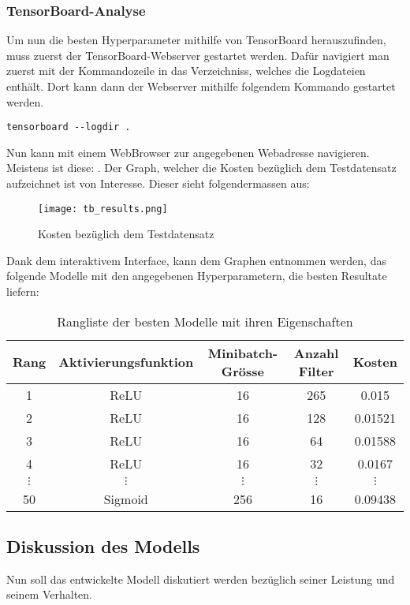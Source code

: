 \subsubsection{TensorBoard-Analyse}
Um nun die besten Hyperparameter mithilfe von TensorBoard herauszufinden, muss
zuerst der TensorBoard-Webserver gestartet werden. Dafür navigiert man zuerst
mit der Kommandozeile in das Verzeichniss, welches die Logdateien enthält.
Dort kann dann der Webserver mithilfe folgendem Kommando gestartet werden.
\begin{verbatim}
tensorboard --logdir .
\end{verbatim}
Nun kann mit einem WebBrowser zur angegebenen Webadresse navigieren. Meistens
ist diese: .
Der Graph, welcher die Kosten bezüglich dem Testdatensatz aufzeichnet ist von
Interesse. Dieser sieht folgendermassen aus:
\para{}
\begin{figure}[h!]
  \centering
  \texttt{[image: tb\_results.png]}
  \caption{Kosten bezüglich dem Testdatensatz}
\end{figure}
\para{}
Dank dem interaktivem Interface, kann dem Graphen entnommen werden, das folgende
Modelle mit den angegebenen Hyperparametern, die besten Resultate liefern:

\para{}
\begin{table}[h!]
  \centering
  \begin{tabular}{ |c|c|c|c|c| }
    \hline
    Rang & Aktivierungsfunktion & Minibatch-Grösse & Anzahl Filter & Kosten \\
    \hline
    1 & ReLU & 16 & 265 & 0.015 \\
    2 & ReLU & 16 & 128 & 0.01521 \\
    3 & ReLU & 16 & 64 & 0.01588 \\
    4 & ReLU & 16 & 32 & 0.0167 \\
    $\vdots$ & $\vdots$ & $\vdots$ & $\vdots$ & $\vdots$ \\
    50 & Sigmoid & 256 & 16 & 0.09438 \\
    \hline
  \end{tabular}
  \caption{Rangliste der besten Modelle mit ihren Eigenschaften}
\end{table}
\para{}


\subsection{Diskussion des Modells}
Nun soll das entwickelte Modell diskutiert werden bezüglich seiner Leistung und
seinem Verhalten.
